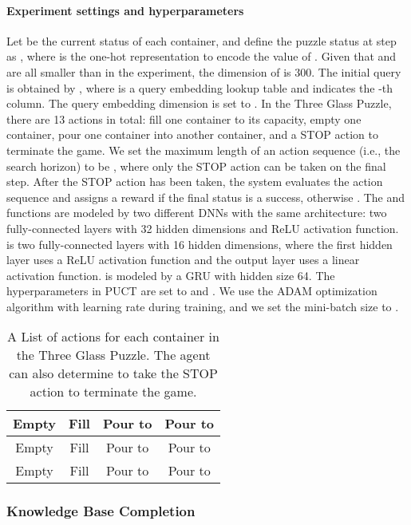 \documentclass{article}
\begin{document}
\paragraph{Experiment settings and hyperparameters}
Let  be the current status of each container, and define the puzzle status at step  as , where  is the one-hot representation to encode the value of . 
Given that  and  are all smaller than  in the experiment, the dimension of  is 300. 
The initial query  is obtained by , where  is a query embedding lookup table and  indicates the -th column.
The query embedding dimension is set to .
In the Three Glass Puzzle, there are 13 actions in total: fill one container to its capacity, empty one container, pour one container into another container, and a STOP action to terminate the game. 
We set the maximum length of an action sequence (i.e., the search horizon) to be , where only the STOP action can be taken on the final step.
After the STOP action has been taken, the system evaluates the action sequence and assigns a reward  if the final status is a success, otherwise . The  and  functions are modeled by two different DNNs with the same architecture: two fully-connected layers with 32 hidden dimensions and ReLU activation function.
 is two fully-connected layers with 16 hidden dimensions, where the first hidden layer uses a ReLU activation function and the output layer uses a linear activation function. 
 is modeled by a GRU with hidden size 64.
The hyperparameters in PUCT are set to  and . We use the ADAM optimization algorithm with learning rate  during training, and we set the mini-batch size to .


\begin{table}[t]
	\centering
	{\caption{A List of actions for each container in the Three Glass Puzzle. The agent can also determine to take the STOP action to terminate the game.}
		\label{tab:puzzle_actions}
		\begin{tabular}{|c|c|c|c|}
			\hline
			 Empty  & Fill  & Pour  to   & Pour  to  \\
			 \hline
			 Empty  & Fill  & Pour  to   & Pour  to  \\
			 \hline
			 Empty  & Fill  & Pour  to   & Pour  to  \\
			\hline
		\end{tabular}
	}
\end{table}



\label{Appendix:puzzle_details}


\subsubsection{Knowledge Base Completion}
\label{Appendix:kbc_details}
\end{document}
